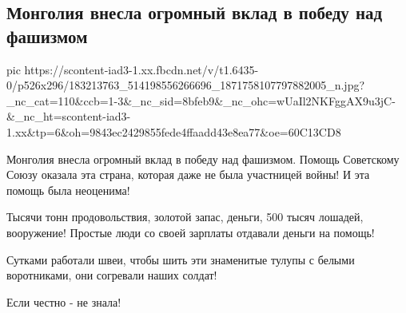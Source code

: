  
 
 
 
 
\subsection{Монголия внесла огромный вклад в победу над фашизмом}

\ifcmt
  pic https://scontent-iad3-1.xx.fbcdn.net/v/t1.6435-0/p526x296/183213763_514198556266696_1871758107797882005_n.jpg?_nc_cat=110&ccb=1-3&_nc_sid=8bfeb9&_nc_ohc=wUaIl2NKFggAX9u3jC-&_nc_ht=scontent-iad3-1.xx&tp=6&oh=9843ec2429855fede4ffaadd43e8ea77&oe=60C13CD8
\fi

Монголия внесла огромный вклад в победу над фашизмом. Помощь Советскому Союзу
оказала эта страна, которая даже не была участницей войны! И эта помощь была
неоценима!

Тысячи тонн продовольствия, золотой запас, деньги, 500 тысяч  лошадей,
вооружение! Простые люди со своей зарплаты отдавали деньги на помощь!  

Сутками работали швеи, чтобы шить эти знаменитые тулупы с белыми воротниками, они согревали наших солдат!

Если честно - не знала!
